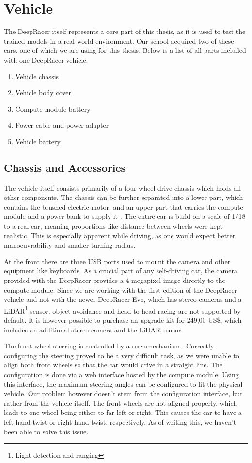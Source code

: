 \chapter{Vehicle}

The DeepRacer itself represents a core part of this thesis, as it is used to test the trained models in a real-world environment. Our school acquired two of these cars. one of which we are using for this thesis. Below is a list of all parts included with one DeepRacer vehicle.

\begin{enumerate}
    \item Vehicle chassis
    \item Vehicle body cover
    \item Compute module battery
    \item Power cable and power adapter
    \item Vehicle battery
\end{enumerate}

\section{Chassis and Accessories}
The vehicle itself consists primarily of a four wheel drive chassis which holds all other components. The chassis can be further separated into a lower part, which contains the brushed electric motor, and an upper part that carries the compute module and a power bank to supply it \cite{AWS19}. The entire car is build on a scale of 1/18 to a real car, meaning proportions like distance between wheels were kept realistic. This is especially apparent while driving, as one would expect better manoeuvrability and smaller turning radius.

At the front there are three USB ports used to mount the camera and other equipment like keyboards. As a crucial part of any self-driving car, the camera provided with the DeepRacer provides a 4-megapixel image directly to the compute module. Since we are working with the first edition of the DeepRacer vehicle and not with the newer DeepRacer Evo, which has stereo cameras and a LiDAR\footnote{Light detection and ranging} sensor, object avoidance and head-to-head racing are not supported by default. It is however possible to purchase an upgrade kit for 249,00 US\$, which includes an additional stereo camera and the LiDAR sensor.

The front wheel steering is controlled by a servomechanism \cite{AWS19}. Correctly configuring the steering proved to be a very difficult task, as we were unable to align both front wheels so that the car would drive in a straight line. The configuration is done via a web interface hosted by the compute module. Using this interface, the maximum steering angles can be configured to fit the physical vehicle. Our problem however doesn't stem from the configuration interface, but rather from the vehicle itself. The front wheels are not aligned properly, which leads to one wheel being either to far left or right. This causes the car to have a left-hand twist or right-hand twist, respectively. As of writing this, we haven't been able to solve this issue.

